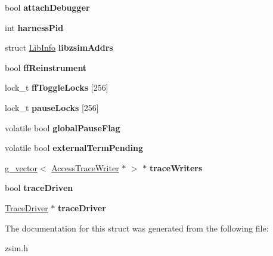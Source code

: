 \begin{DoxyCompactItemize}
\item 
\hypertarget{structGlobSimInfo_a3999e3c24a35a078920112e3e8aa5dab}{bool {\bfseries attach\-Debugger}}\label{structGlobSimInfo_a3999e3c24a35a078920112e3e8aa5dab}

\item 
\hypertarget{structGlobSimInfo_a574a43fdbb86a1c9b4c969c8ae80da5f}{int {\bfseries harness\-Pid}}\label{structGlobSimInfo_a574a43fdbb86a1c9b4c969c8ae80da5f}

\item 
\hypertarget{structGlobSimInfo_a525f0dd999a65c86e2a0cb6b07c109f2}{struct \hyperlink{structLibInfo}{Lib\-Info} {\bfseries libzsim\-Addrs}}\label{structGlobSimInfo_a525f0dd999a65c86e2a0cb6b07c109f2}

\item 
\hypertarget{structGlobSimInfo_a90671c79a157989aae2e21174a4f1c19}{bool {\bfseries ff\-Reinstrument}}\label{structGlobSimInfo_a90671c79a157989aae2e21174a4f1c19}

\item 
\hypertarget{structGlobSimInfo_a0a7e5c5e9cbbb823fe66da867a6cf21a}{lock\-\_\-t {\bfseries ff\-Toggle\-Locks} \mbox{[}256\mbox{]}}\label{structGlobSimInfo_a0a7e5c5e9cbbb823fe66da867a6cf21a}

\item 
\hypertarget{structGlobSimInfo_a8be463e59ea0ba025a7a856228cecef2}{lock\-\_\-t {\bfseries pause\-Locks} \mbox{[}256\mbox{]}}\label{structGlobSimInfo_a8be463e59ea0ba025a7a856228cecef2}

\item 
\hypertarget{structGlobSimInfo_aa51f43511c9b596ee95dc780edb5fd20}{volatile bool {\bfseries global\-Pause\-Flag}}\label{structGlobSimInfo_aa51f43511c9b596ee95dc780edb5fd20}

\item 
\hypertarget{structGlobSimInfo_a68da212f97bc9b9716ce1e99b3131a79}{volatile bool {\bfseries external\-Term\-Pending}}\label{structGlobSimInfo_a68da212f97bc9b9716ce1e99b3131a79}

\item 
\hypertarget{structGlobSimInfo_adda2ea42f7006e3d05c46733e2c121da}{\hyperlink{classg__vector}{g\-\_\-vector}$<$ \hyperlink{classAccessTraceWriter}{Access\-Trace\-Writer} $\ast$ $>$ $\ast$ {\bfseries trace\-Writers}}\label{structGlobSimInfo_adda2ea42f7006e3d05c46733e2c121da}

\item 
\hypertarget{structGlobSimInfo_aea28766376bb27d56c605f6f7ec236da}{bool {\bfseries trace\-Driven}}\label{structGlobSimInfo_aea28766376bb27d56c605f6f7ec236da}

\item 
\hypertarget{structGlobSimInfo_a8a361f32d55d899fd8521977dfa0d54b}{\hyperlink{classTraceDriver}{Trace\-Driver} $\ast$ {\bfseries trace\-Driver}}\label{structGlobSimInfo_a8a361f32d55d899fd8521977dfa0d54b}

\end{DoxyCompactItemize}


The documentation for this struct was generated from the following file\-:\begin{DoxyCompactItemize}
\item 
zsim.\-h\end{DoxyCompactItemize}
